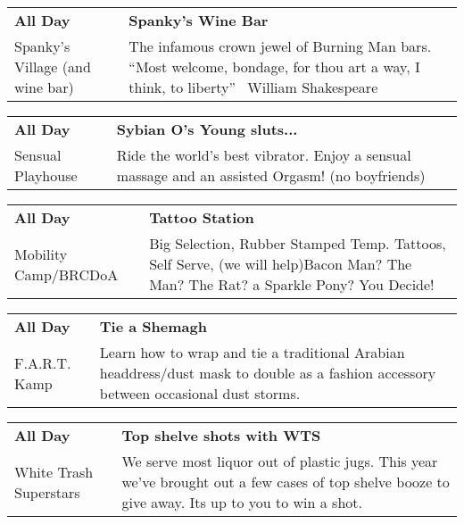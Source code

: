 \begin{tabular}{ p{1in} p{2.2in} }
    \textbf{All Day} & \textbf{Spanky's Wine Bar} \\
    Spanky's Village (and wine bar) \newline  & The infamous crown jewel of Burning Man bars.  ``Most welcome, bondage, for thou art a way, I think, to liberty''  ~William Shakespeare~ \\
    \hline 
\end{tabular}
    
\begin{tabular}{ p{1in} p{2.2in} }
    \textbf{All Day} & \textbf{Sybian O's Young sluts...} \\
    Sensual Playhouse \newline  & Ride the world's best vibrator. Enjoy a sensual massage and an assisted Orgasm! (no boyfriends) \\
    \hline 
\end{tabular}
    
\begin{tabular}{ p{1in} p{2.2in} }
    \textbf{All Day} & \textbf{Tattoo Station} \\
    Mobility Camp/BRCDoA \newline  & Big Selection, Rubber Stamped Temp. Tattoos, Self Serve, (we will help)Bacon Man? The Man? The Rat? a Sparkle Pony? You Decide! \\
    \hline 
\end{tabular}
    
\begin{tabular}{ p{1in} p{2.2in} }
    \textbf{All Day} & \textbf{Tie a Shemagh} \\
    F.A.R.T. Kamp \newline  & Learn how to wrap and tie a traditional Arabian headdress/dust mask to double as a fashion accessory between occasional dust storms. \\
    \hline 
\end{tabular}
    
\begin{tabular}{ p{1in} p{2.2in} }
    \textbf{All Day} & \textbf{Top shelve shots with WTS} \\
    White Trash Superstars \newline  & We serve most liquor out of plastic jugs. This year we've brought out a few cases of top shelve booze to give away. Its up to you to win a shot. \\
    \hline 
\end{tabular}
    
